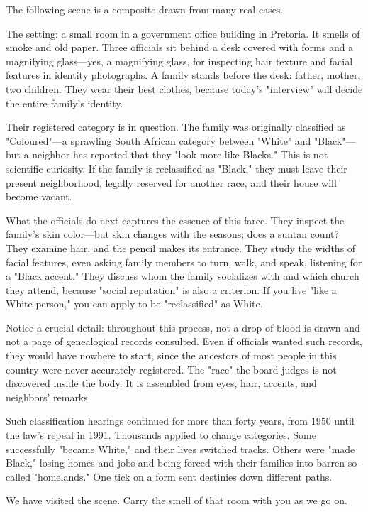 The following scene is a composite drawn from many real cases.

The setting: a small room in a government office building in Pretoria. It smells of smoke and old paper. Three officials sit behind a desk covered with forms and a magnifying glass---yes, a magnifying glass, for inspecting hair texture and facial features in identity photographs. A family stands before the desk: father, mother, two children. They wear their best clothes, because today's "interview" will decide the entire family's identity.

Their registered category is in question. The family was originally classified as "Coloured"---a sprawling South African category between "White" and "Black"---but a neighbor has reported that they "look more like Blacks." This is not scientific curiosity. If the family is reclassified as "Black," they must leave their present neighborhood, legally reserved for another race, and their house will become vacant.

What the officials do next captures the essence of this farce. They inspect the family's skin color---but skin changes with the seasons; does a suntan count? They examine hair, and the pencil makes its entrance. They study the widths of facial features, even asking family members to turn, walk, and speak, listening for a "Black accent." They discuss whom the family socializes with and which church they attend, because "social reputation" is also a criterion. If you live "like a White person," you can apply to be "reclassified" as White.

Notice a crucial detail: throughout this process, not a drop of blood is drawn and not a page of genealogical records consulted. Even if officials wanted such records, they would have nowhere to start, since the ancestors of most people in this country were never accurately registered. The "race" the board judges is not discovered inside the body. It is assembled from eyes, hair, accents, and neighbors' remarks.

Such classification hearings continued for more than forty years, from 1950 until the law's repeal in 1991. Thousands applied to change categories. Some successfully "became White," and their lives switched tracks. Others were "made Black," losing homes and jobs and being forced with their families into barren so-called "homelands." One tick on a form sent destinies down different paths.

We have visited the scene. Carry the smell of that room with you as we go on.

